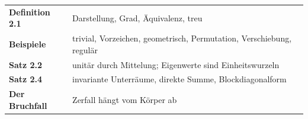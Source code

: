 \begin{merksatz}
\begin{center}
\renewcommand{\arraystretch}{1.5}
\begin{tabular}{@{}P{3.0cm}P{5.6cm}@{}}
\toprule
\textbf{Definition 2.1} & Darstellung, Grad, Äquivalenz, treu\\
\textbf{Beispiele} & trivial, Vorzeichen, geometrisch, Permutation, Verschiebung, regulär\\
\textbf{Satz 2.2} & unitär durch Mittelung; Eigenwerte sind Einheitswurzeln\\
\textbf{Satz 2.4} & invariante Unterräume, direkte Summe, Blockdiagonalform\\
\textbf{Der Bruchfall} & Zerfall hängt vom Körper ab\\
\bottomrule
\end{tabular}
\end{center}

\begin{center}
\begin{minipage}{0.88\textwidth}
\end{minipage}
\end{center}
\end{merksatz}
